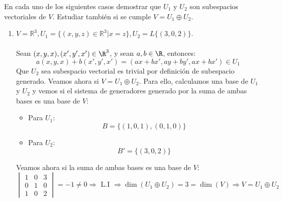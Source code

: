 \begin{ejercicio}
	En cada uno de los siguientes casos demostrar que \( U_1 \) y \( U_2 \) son subespacios vectoriales de \( V \). Estudiar también si se cumple \( V = U_1 \oplus U_2 \).
	\begin{enumerate}
		\item \( V = \mathbb{R}^3, U_1 = \{(x,y,z) \in \mathbb{R}^3 | x = z\}, U_2 = L\{(3,0,2)\} \).
		      \\ \\
		      Sean $(x,y,x),(x',y',x') \in \R^3$, y sean $a,b \in \R$, entonces:
		      \begin{equation*}
			      a(x,y,x) + b(x',y',x') = (ax+bx',ay+by',ax+bx') \in U_1
		      \end{equation*}
		      Que $U_2$ sea subespacio vectorial es trivial por definición de subespacio generado. Veamos ahora si $V = U_1 \oplus U_2$. Para ello, calculamos
		      una base de $U_1$ y $U_2$ y vemos si el sistema de generadores generado por la suma de ambas bases es una base de $V$:
		      \begin{itemize}
			      \item Para $U_1$:
			            \begin{equation*}
				            B = \{(1,0,1),(0,1,0)\}
			            \end{equation*}
			      \item Para $U_2$:
			            \begin{equation*}
				            B' = \{(3,0,2)\}
			            \end{equation*}
		      \end{itemize}
		      Veamos ahora si la suma de ambas bases es una base de $V$:
		      \begin{equation*}
			      \begin{vmatrix}
				      1 & 0 & 3 \\
				      0 & 1 & 0 \\
				      1 & 0 & 2
			      \end{vmatrix} = -1 \neq 0 \Rightarrow \text{ L.I } \Rightarrow \dim(U_1 \oplus U_2) = 3 = \dim(V) \Rightarrow V = U_1 \oplus U_2
		      \end{equation*}


\end{enumerate}
\end{ejercicio}
